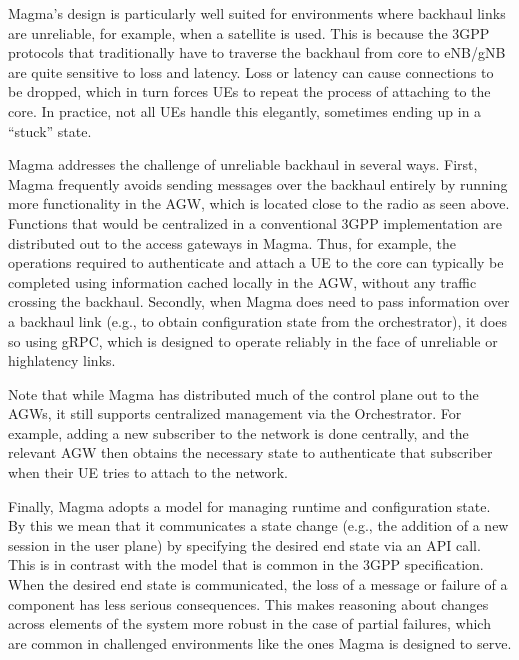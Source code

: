 \documentclass[a4paper,11pt,english]{sphinxmanual}
\begin{document}
\sphinxAtStartPar
Magma’s design is particularly well suited for environments where
backhaul links are unreliable, for example, when a satellite is used.
This is because the 3GPP protocols that traditionally have to traverse
the backhaul from core to eNB/gNB are quite sensitive to loss and
latency. Loss or latency can cause connections to be dropped, which in
turn forces UEs to repeat the process of attaching to the core. In
practice, not all UEs handle this elegantly, sometimes ending up in a
“stuck” state.

\sphinxAtStartPar
Magma addresses the challenge of unreliable backhaul in several ways.
First, Magma frequently avoids sending messages over the backhaul
entirely by running more functionality in the AGW, which is located
close to the radio as seen above. Functions that would be centralized
in a conventional 3GPP implementation are distributed out to the access
gateways in Magma. Thus, for example, the operations required to
authenticate and attach a UE to the core can typically be completed
using information cached locally in the AGW, without any traffic
crossing the backhaul. Secondly, when Magma does need to pass
information over a backhaul link (e.g., to obtain configuration state
from the orchestrator), it does so using gRPC, which is designed to
operate reliably in the face of unreliable or high\sphinxhyphen{}latency links.

\sphinxAtStartPar
Note that while Magma has distributed much of the control plane out to
the AGWs, it still supports centralized management via the Orchestrator.
For example, adding a new subscriber to the network is done centrally,
and the relevant AGW then obtains the necessary state to authenticate
that subscriber when their UE tries to attach to the network.

\sphinxAtStartPar
Finally, Magma adopts a  model for managing runtime and
configuration state. By this we mean that it communicates a state
change (e.g., the addition of a new session in the user plane) by
specifying the desired end state via an API call. This is in contrast
with the  model that is common in the 3GPP
specification.  When the desired end state is communicated, the
loss of a message or failure of a component has less serious
consequences. This makes reasoning about changes across elements
of the system more robust in the case of partial failures, which are
common in challenged environments like the ones Magma is designed to
serve.
\end{document}
